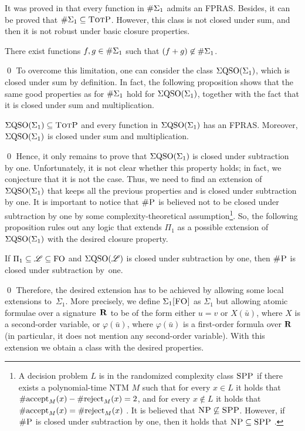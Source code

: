 It was proved in \cite{SalujaST95} that every function in $\#\Sigma_{1}$ admits an FPRAS. Besides, it can be proved that $\#\Sigma_{1} \subseteq \text{\sc TotP}$. 
However, this class is not closed under sum, and then it is not robust under basic closure properties. 
\begin{prop}\label{prop-e1-nc}
There exist functions $f, g \in \#\Sigma_{1}$ such that $(f + g) \not\in \#\Sigma_{1}$.
\end{prop}
\proof

\qed
To overcome this limitation, one can consider the class $\Sigma{\rm QSO}(\Sigma_{1})$, which is closed under sum by definition. In fact, the following proposition shows that the same good properties as for $\#\Sigma_{1}$ hold for $\Sigma{\rm QSO}(\Sigma_{1})$, together with the fact that it is closed under sum and multiplication.
\begin{prop} \label{prop:qe0-fp-qe1-totp-fptras}
$\Sigma{\rm QSO}(\Sigma_{1}) \subseteq \text{\sc TotP}$ and every function in $\Sigma{\rm QSO}(\Sigma_{1})$ has an FPRAS. Moreover, $\Sigma{\rm QSO}(\Sigma_{1})$ is closed under sum and multiplication.
\end{prop}
\proof

\qed
Hence, it only remains to prove that $\Sigma{\rm QSO}(\Sigma_{1})$ is closed under subtraction by one. Unfortunately, it is not clear whether this property holds; in fact, we conjecture that it is not the case. Thus, we need to find an extension of $\Sigma{\rm QSO}(\Sigma_{1})$ that keeps all the previous properties and is closed under subtraction by one. It is important to notice that $\text{\sc \#P}$ is believed not to be closed under subtraction by one by some complexity-theoretical assumption\footnote{A decision problem $L$ is in the randomized complexity class $\text{\sc SPP}$ if there exists a polynomial-time NTM $M$ such that for every $x \in L$ it holds that $\text{\rm \#accept}_M(x) - \text{\rm \#reject}_M(x) = 2$, and for every $x \not\in L$ it holds that $\text{\rm \#accept}_M(x) = \text{\rm \#reject}_M(x)$ \cite{OH93,FFK94}. It is believed that $\text{\sc NP} \not\subseteq \text{\sc SPP}$.
However, if $\text{\sc \#P}$ is closed under subtraction by one, then it holds that $\text{\sc NP} \subseteq \text{\sc SPP}$ \cite{OH93}.}. So, the following proposition rules out any logic that extends $\Pi_1$ as a possible extension of~$\Sigma{\rm QSO}(\Sigma_{1})$ with the desired closure property.
\begin{prop} \label{pi-minusone}
If $\Pi_1 \subseteq \mathscr{L} \subseteq {\rm FO}$ and $\Sigma{\rm QSO}(\mathscr{L})$ is closed under subtraction by one, then $\text{\sc \#P}$ is closed under subtraction by~one. 
\end{prop}
\proof

\qed
Therefore, the desired extension has to be achieved by allowing some local extensions to~$\Sigma_1$. More precisely, we define $\Sigma_{1}\textsc{[FO]}$ as $\Sigma_1$ but allowing atomic formulae over a signature~$\mathbf{R}$ to be of the form either $u = v$ or $X(\bar u)$, where $X$ is a second-order variable, or $\varphi(\bar u)$, where $\varphi(\bar u)$ is a first-order formula over $\mathbf{R}$ (in particular, it does not mention any second-order variable). With this extension we obtain a class with the desired properties.
